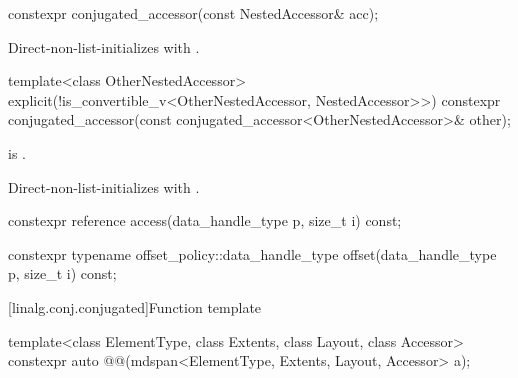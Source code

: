 %
\begin{itemdecl}
constexpr conjugated_accessor(const NestedAccessor& acc);
\end{itemdecl}

\begin{itemdescr}
\pnum
\effects
Direct-non-list-initializes
 with .
\end{itemdescr}

%
\begin{itemdecl}
template<class OtherNestedAccessor>
  explicit(!is_convertible_v<OtherNestedAccessor, NestedAccessor>>)
    constexpr conjugated_accessor(const conjugated_accessor<OtherNestedAccessor>& other);
\end{itemdecl}

\begin{itemdescr}
\pnum
\constraints
{}
is .

\pnum
\effects
Direct-non-list-initializes 
with .
\end{itemdescr}

%
\begin{itemdecl}
constexpr reference access(data_handle_type p, size_t i) const;
\end{itemdecl}

\begin{itemdescr}
\pnum
\returns
{}
\end{itemdescr}

%
\begin{itemdecl}
constexpr typename offset_policy::data_handle_type offset(data_handle_type p, size_t i) const;
\end{itemdecl}

\begin{itemdescr}
\pnum
\returns
{}
\end{itemdescr}

[linalg.conj.conjugated]{Function template }

\begin{itemdecl}
  template<class ElementType, class Extents, class Layout, class Accessor>
    constexpr auto @@(mdspan<ElementType, Extents, Layout, Accessor> a);
\end{itemdecl}

